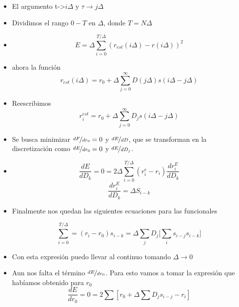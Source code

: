 \begin{itemize}
	\item El argumento t->$i\Delta$ y $\tau \rightarrow j\Delta$
	\item Dividimos el rango $0-T$ en $\Delta$, donde $T= N \Delta$
	\item 
	\begin{equation}
		E= \Delta \sum_{i=0}^{T/\Delta} (r_{est}(i\Delta) - r(i\Delta))^2
	\end{equation} 

	\item ahora la función 
	\begin{equation}
	r_{est}(i\Delta) = r_0 + \Delta \sum^\infty_{j=0} D(j\Delta)s(i\Delta - j\Delta)	
	\end{equation}
	\item Reescribimos
	\begin{equation}
		r^{est}_i = r_0 + \Delta \sum^\infty_{j=0} D_j s(i\Delta - j\Delta)	
	\end{equation}

	\item Se busca minimizar $\nicefrac{dF}{dr_0}=0$ y $\nicefrac{dE}{dD}$, que se transforman en la discretización como $\nicefrac{dE}{dr_0}=0$ y $\nicefrac{dE}{dD_j}$.
	\item 
	\begin{equation}
		\frac{dE}{d D_k} = 0 = 2\Delta \sum_{i=0}^{T/\Delta} (r^e_i - r_i)\frac{dr^E_i}{d D_k}
	\end{equation}
	\begin{equation}
		\frac{dr^E_i}{d D_k}= \Delta S_{i-k}
	\end{equation}

	\item Finalmente nos quedan las siguientes ecuaciones para las funcionales

	\begin{equation}
		\sum_{i=0}^{T/\Delta}= (r_i - r_0)s_{i-k} = \Delta \sum_j D_j \big[ \sum_i s_{i-j} s_{i-k}\big]
	\end{equation}
	\item Con esta expresión puedo llevar al continuo tomando $\Delta \rightarrow 0 $
	\item Aun nos falta el término $\nicefrac{dE}{dr_0}$. Para esto vamos a tomar la expresión que habíamos obtenido para $r_0$
	\begin{equation}
		\frac{dE}{dr_0} = 0 = 2 \sum [r_0 + \Delta \sum D_j s_{i-j} -r_i]
	\end{equation}


\end{itemize}
